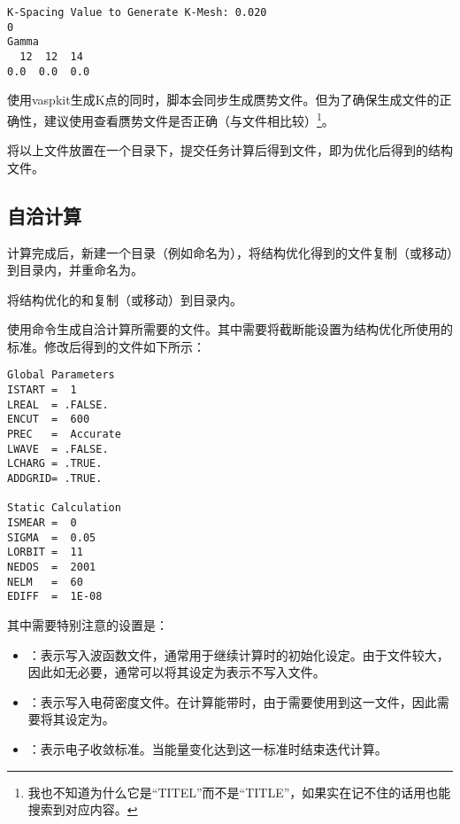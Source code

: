 \begin{lstlisting}[caption=KPOINTS]
K-Spacing Value to Generate K-Mesh: 0.020
0
Gamma
  12  12  14
0.0  0.0  0.0
\end{lstlisting}

\begin{attention}
    使用vaspkit生成K点的同时，脚本会同步生成赝势文件。但为了确保生成文件的正确性，建议使用查看赝势文件是否正确（与文件相比较）\footnote{我也不知道为什么它是“TITEL”而不是“TITLE”，如果实在记不住的话用也能搜索到对应内容。}。
\end{attention}

将以上文件放置在一个目录下，提交任务计算后得到文件，即为优化后得到的结构文件。

\subsection{自洽计算}\label{subsec:VASP计算能带过程-自洽计算}

计算完成后，新建一个目录（例如命名为），将结构优化得到的文件复制（或移动）到目录内，并重命名为。

将结构优化的和复制（或移动）到目录内。

使用命令生成自洽计算所需要的文件。其中需要将截断能设置为结构优化所使用的标准。修改后得到的文件如下所示：

\begin{lstlisting}[caption=INCAR]
Global Parameters
ISTART =  1
LREAL  = .FALSE.
ENCUT  =  600
PREC   =  Accurate
LWAVE  = .FALSE.
LCHARG = .TRUE. 
ADDGRID= .TRUE. 

Static Calculation
ISMEAR =  0
SIGMA  =  0.05
LORBIT =  11
NEDOS  =  2001
NELM   =  60
EDIFF  =  1E-08
\end{lstlisting}

其中需要特别注意的设置是：

\begin{itemize}
    \item {}：表示写入波函数文件，通常用于继续计算时的初始化设定。由于文件较大，因此如无必要，通常可以将其设定为表示不写入文件。
    \item {}：表示写入电荷密度文件。在计算能带时，由于需要使用到这一文件，因此需要将其设定为。
    \item {}：表示电子收敛标准。当能量变化达到这一标准时结束迭代计算。
\end{itemize}

